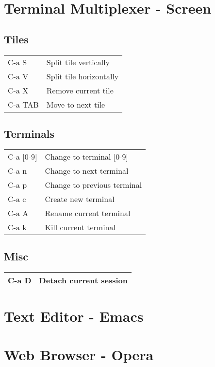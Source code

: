 \documentclass[10pt,a4paper,oneside]{article}
\begin{document}
\section{Terminal Multiplexer - Screen}

\subsection{Tiles}
\begin{center}
  \begin{tabular}{|l|l|}
    \hline
    C-a S   & Split tile vertically\\
    C-a V   & Split tile horizontally\\
    C-a X   & Remove current tile\\
    C-a TAB & Move to next tile\\
    \hline
  \end{tabular}
\end{center}

\subsection{Terminals}
\begin{center}
  \begin{tabular}{|l|l|}
    \hline
    C-a [0-9] & Change to terminal [0-9]\\
    C-a n     & Change to next terminal\\
    C-a p     & Change to previous terminal\\
    C-a c     & Create new terminal\\
    C-a A     & Rename current terminal\\
    C-a k     & Kill current terminal\\
    \hline
  \end{tabular}
\end{center}

\subsection{Misc}
\begin{center}
  \begin{tabular}{|l|l|}
    \hline
    C-a D & Detach current session\\
    \hline
  \end{tabular}
\end{center}

\section{Text Editor - Emacs}


\section{Web Browser - Opera}
\end{document}
